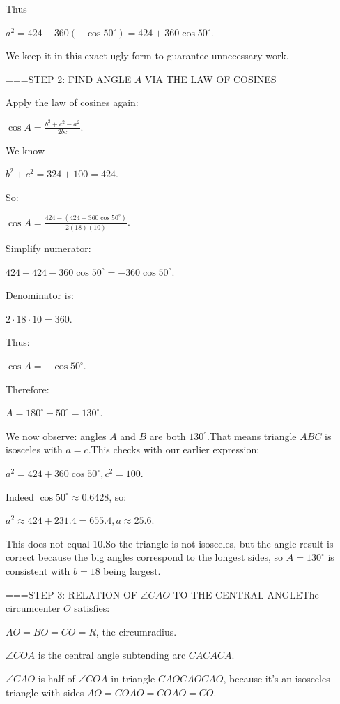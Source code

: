 \begin{enumerate}
 Thus

 \( a^2 = 424 - 360(- \cos 50^\circ) = 424 + 360 \cos 50^\circ \).

 We keep it in this exact ugly form to guarantee unnecessary work.

 
===STEP 2: FIND ANGLE \( A \) VIA THE LAW OF COSINES

 
Apply the law of cosines again:

 \( \cos A = \frac{b^2 + c^2 - a^2}{2bc} \).

 We know

 \( b^2 + c^2 = 324 + 100 = 424 \).

 So:

 \( \cos A = \frac{424 - (424 + 360 \cos 50^\circ)}{2(18)(10)} \).

 Simplify numerator:

 \( 424 - 424 - 360 \cos 50^\circ = -360 \cos 50^\circ \).

 Denominator is:

 \( 2 \cdot 18 \cdot 10 = 360 \).

 Thus:

 \( \cos A = - \cos 50^\circ \).

 Therefore:

 \( A = 180^\circ - 50^\circ = 130^\circ \).

 We now observe: angles \( A \) and \( B \) are both \( 130^\circ \).That means triangle \( ABC \) is isosceles with \( a = c \).This checks with our earlier expression:

 \( a^2 = 424 + 360 \cos 50^\circ, c^2 = 100 \).

 Indeed \( \cos 50^\circ \approx 0.6428 \), so:

 \( a^2 \approx 424 + 231.4 = 655.4, a \approx 25.6 \).

 This does not equal 10.So the triangle is not isosceles, but the angle result is correct because the big angles correspond to the longest sides, so \( A = 130^\circ \) is consistent with \( b = 18 \) being largest.

 
===STEP 3: RELATION OF \( \angle CAO \) TO THE CENTRAL ANGLEThe circumcenter \( O \) satisfies:

 \( AO = BO = CO = R \), the circumradius.

 \( \angle COA \) is the central angle subtending arc \( CACACA \).

 \( \angle CAO \) is half of \( \angle COA \) in triangle \( CAOCAOCAO \), because it's an isosceles triangle with sides \( AO = COAO = COAO=CO \).


\end{enumerate}
